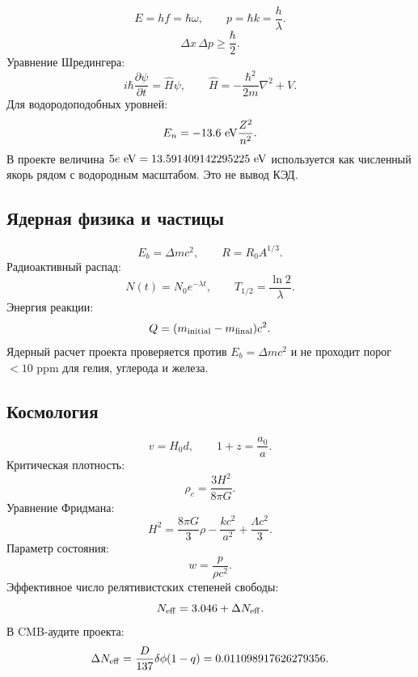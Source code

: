 \documentclass[11pt]{article}
\begin{document}
\begin{equation}
    E=hf=\hbar\omega,\qquad
    p=\hbar k=\frac{h}{\lambda}.
\end{equation}
\begin{equation}
    \Delta x\,\Delta p\ge\frac{\hbar}{2}.
\end{equation}
Уравнение Шредингера:
\begin{equation}
    i\hbar\frac{\partial\psi}{\partial t}=\hat{H}\psi,
    \qquad
    \hat{H}=-\frac{\hbar^2}{2m}\nabla^2+V.
\end{equation}
Для водородоподобных уровней:
\begin{equation}
    E_n=-13.6~{\rm eV}\frac{Z^2}{n^2}.
\end{equation}
В проекте величина $5e~{\rm eV}=13.591409142295225~{\rm eV}$ используется как
численный якорь рядом с водородным масштабом.  Это не вывод КЭД.

\subsection{Ядерная физика и частицы}

\begin{equation}
    E_b=\Delta mc^2,\qquad
    R=R_0A^{1/3}.
\end{equation}
Радиоактивный распад:
\begin{equation}
    N(t)=N_0e^{-\lambda t},\qquad
    T_{1/2}=\frac{\ln2}{\lambda}.
\end{equation}
Энергия реакции:
\begin{equation}
    Q=(m_{\rm initial}-m_{\rm final})c^2.
\end{equation}
Ядерный расчет проекта проверяется против $E_b=\Delta mc^2$ и не проходит
порог $<10$ ppm для гелия, углерода и железа.

\subsection{Космология}

\begin{equation}
    v=H_0d,\qquad
    1+z=\frac{a_0}{a}.
\end{equation}
Критическая плотность:
\begin{equation}
    \rho_c=\frac{3H^2}{8\pi G}.
\end{equation}
Уравнение Фридмана:
\begin{equation}
    H^2=\frac{8\pi G}{3}\rho-\frac{kc^2}{a^2}
    +\frac{\Lambda c^2}{3}.
\end{equation}
Параметр состояния:
\begin{equation}
    w=\frac{p}{\rho c^2}.
\end{equation}
Эффективное число релятивистских степеней свободы:
\begin{equation}
    N_{\rm eff}=3.046+\Delta N_{\rm eff}.
\end{equation}
В CMB-аудите проекта:
\begin{equation}
    \Delta N_{\rm eff}
    =
    \frac{D}{137}\delta\phi(1-q)
    =
    0.011098917626279356.
\end{equation}
\end{document}
